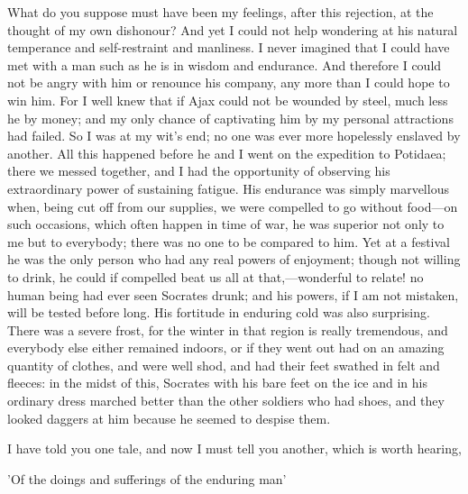 \documentclass[11pt,letter]{article}
\begin{document}
\par  What do you suppose must have been my feelings, after this rejection, at the thought of my own dishonour? And yet I could not help wondering at his natural temperance and self-restraint and manliness. I never imagined that I could have met with a man such as he is in wisdom and endurance. And therefore I could not be angry with him or renounce his company, any more than I could hope to win him. For I well knew that if Ajax could not be wounded by steel, much less he by money; and my only chance of captivating him by my personal attractions had failed. So I was at my wit's end; no one was ever more hopelessly enslaved by another. All this happened before he and I went on the expedition to Potidaea; there we messed together, and I had the opportunity of observing his extraordinary power of sustaining fatigue. His endurance was simply marvellous when, being cut off from our supplies, we were compelled to go without food—on such occasions, which often happen in time of war, he was superior not only to me but to everybody; there was no one to be compared to him. Yet at a festival he was the only person who had any real powers of enjoyment; though not willing to drink, he could if compelled beat us all at that,—wonderful to relate! no human being had ever seen Socrates drunk; and his powers, if I am not mistaken, will be tested before long. His fortitude in enduring cold was also surprising. There was a severe frost, for the winter in that region is really tremendous, and everybody else either remained indoors, or if they went out had on an amazing quantity of clothes, and were well shod, and had their feet swathed in felt and fleeces: in the midst of this, Socrates with his bare feet on the ice and in his ordinary dress marched better than the other soldiers who had shoes, and they looked daggers at him because he seemed to despise them.

\par  I have told you one tale, and now I must tell you another, which is worth hearing,

\par  'Of the doings and sufferings of the enduring man'
\end{document}
